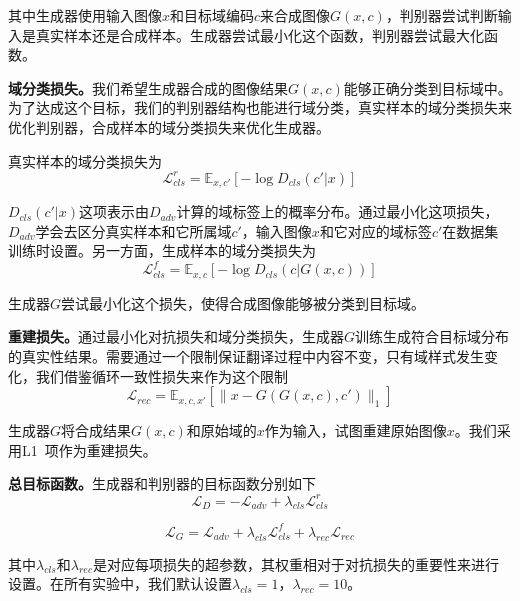 其中生成器使用输入图像$x$和目标域编码$c$来合成图像$G(x,c)$，判别器尝试判断输入是真实样本还是合成样本。生成器尝试最小化这个函数，判别器尝试最大化函数。

\textbf{域分类损失。}我们希望生成器合成的图像结果$G(x,c)$能够正确分类到目标域中。为了达成这个目标，我们的判别器结构也能进行域分类，真实样本的域分类损失来优化判别器，合成样本的域分类损失来优化生成器。

真实样本的域分类损失为
\begin{equation}
\label{equ:cls_real_exp2}
\mathcal{L}_{cls}^{r} = \mathbb{E}_{x,c'}[-\log D_{cls}(c'|x)]
\end{equation}

$D_{cls}(c'|x)$这项表示由$D_{adv}$计算的域标签上的概率分布。通过最小化这项损失，$D_{adv}$学会去区分真实样本和它所属域$c'$，输入图像$x$和它对应的域标签$c'$在数据集训练时设置。另一方面，生成样本的域分类损失为
\begin{equation}
\label{equ:cls_fake_exp2}
\mathcal{L}_{cls}^{f} = \mathbb{E}_{x,c}[-\log D_{cls}(c|G(x,c))]
\end{equation}

生成器$G$尝试最小化这个损失，使得合成图像能够被分类到目标域。

\textbf{重建损失。}通过最小化对抗损失和域分类损失，生成器$G$训练生成符合目标域分布的真实性结果。需要通过一个限制保证翻译过程中内容不变，只有域样式发生变化，我们借鉴循环一致性损失来作为这个限制
\begin{equation}
\label{equ:rec_exp2}
\mathcal{L}_{rec} = \mathbb{E}_{x,c,x'}[\| x-G(G(x,c),c') \|_1]
\end{equation}

生成器$G$将合成结果$G(x,c)$和原始域的$x$作为输入，试图重建原始图像$x$。我们采用L1~\cite{shrivastava2017learning}项作为重建损失。

\textbf{总目标函数。}生成器和判别器的目标函数分别如下
\begin{equation}
\label{equ:D_exp2}
\mathcal{L}_{D} = -\mathcal{L}_{adv} + \lambda_{cls}\mathcal{L}_{cls}^{r}
\end{equation}

\begin{equation}
\label{equ:G_exp2}
\mathcal{L}_{G} = \mathcal{L}_{adv}+\lambda_{cls}\mathcal{L}_{cls}^{f}+\lambda_{rec}\mathcal{L}_{rec}
\end{equation}

其中$\lambda_{cls}$和$\lambda_{rec}$是对应每项损失的超参数，其权重相对于对抗损失的重要性来进行设置。在所有实验中，我们默认设置$\lambda_{cls}=1$，$\lambda_{rec}=10$。


